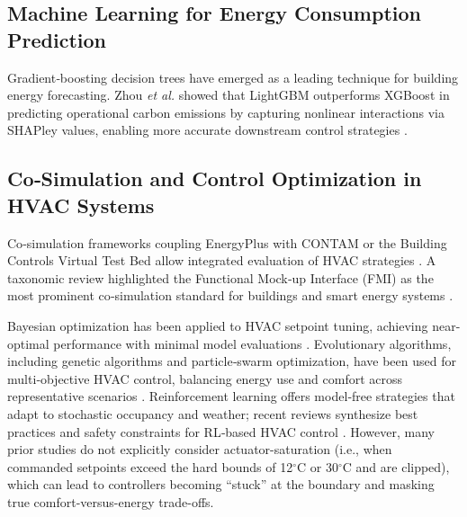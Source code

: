 \subsection{Machine Learning for Energy Consumption Prediction}

Gradient‐boosting decision trees have emerged as a leading technique for building energy forecasting. Zhou \emph{et al.} showed that LightGBM outperforms XGBoost in predicting operational carbon emissions by capturing nonlinear interactions via SHAPley values, enabling more accurate downstream control strategies \cite{Zhou2024LightGBM}.

\subsection{Co‐Simulation and Control Optimization in HVAC Systems}

Co‐simulation frameworks coupling EnergyPlus with CONTAM or the Building Controls Virtual Test Bed allow integrated evaluation of HVAC strategies \cite{alonso2022using}. A taxonomic review highlighted the Functional Mock‐up Interface (FMI) as the most prominent co‐simulation standard for buildings and smart energy systems \cite{Alfalouji2023CoSim}.

Bayesian optimization has been applied to HVAC setpoint tuning, achieving near-optimal performance with minimal model evaluations \cite{Lin2023BayesOpt}. Evolutionary algorithms, including genetic algorithms and particle‐swarm optimization, have been used for multi‐objective HVAC control, balancing energy use and comfort across representative scenarios \cite{EC32024Evolutionary,MultiObj2024}. Reinforcement learning offers model‐free strategies that adapt to stochastic occupancy and weather; recent reviews synthesize best practices and safety constraints for RL‐based HVAC control \cite{RLReview2025}. However, many prior studies do not explicitly consider actuator-saturation (i.e., when commanded setpoints exceed the hard bounds of 12$^\circ$C or 30$^\circ$C and are clipped), which can lead to controllers becoming “stuck” at the boundary and masking true comfort-versus-energy trade-offs.